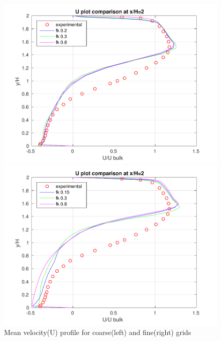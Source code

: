 \begin{figure}[H]
\ContinuedFloat
\begin{minipage}[b]{0.5\linewidth}
\includegraphics[scale=0.5]{figure/coarse/U_coarse_two.pdf}
\end{minipage}
\begin{minipage}[b]{0.5\linewidth}
\includegraphics[scale=0.5]{figure/fine/U_fine_two.pdf}
\end{minipage}
\caption{Mean velocity(U) profile for coarse(left) and fine(right) grids}
\label{fig:48}
\end{figure}

